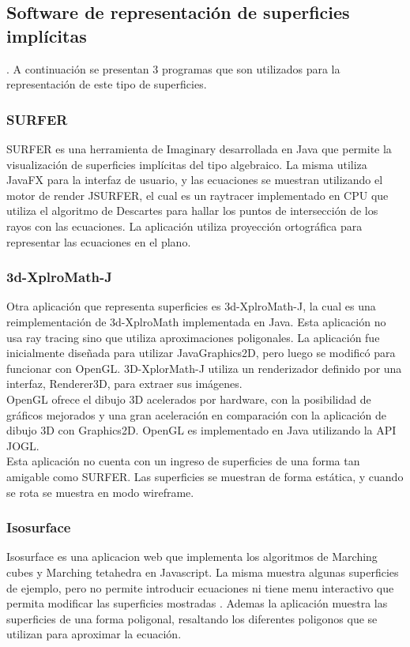 \documentclass[12pt]{article}
\begin{document}
\subsection{Software de representación de superficies implícitas}.
A continuación se presentan 3 programas que son utilizados para la representación de este tipo de superficies.
\subsubsection{SURFER}
SURFER es una herramienta de Imaginary desarrollada en Java que permite la visualización de superficies implícitas del tipo algebraico. La misma utiliza JavaFX para la interfaz de usuario, y las ecuaciones se muestran utilizando el motor de render JSURFER, el cual es un raytracer implementado en CPU que utiliza el algoritmo de Descartes para hallar los puntos de intersección de los rayos con las ecuaciones. La aplicación utiliza proyección ortográfica para representar las ecuaciones en el plano.
\subsubsection{3d-XplroMath-J}
Otra aplicación que representa superficies es 3d-XplroMath-J, la cual es una reimplementación de 3d-XplroMath implementada en Java. Esta aplicación no usa ray tracing sino que utiliza aproximaciones poligonales. La aplicación fue inicialmente diseñada para utilizar JavaGraphics2D, pero luego se modificó para funcionar con OpenGL. 3D-XplorMath-J utiliza un  renderizador definido por una interfaz, Renderer3D, para extraer sus imágenes. 
\\OpenGL ofrece el dibujo 3D acelerados por hardware, con la posibilidad de gráficos mejorados y una gran aceleración en comparación con la aplicación de dibujo 3D con Graphics2D. OpenGL es implementado en Java utilizando la API JOGL.
\\Esta aplicación no cuenta con un ingreso de superficies de una forma tan amigable como SURFER. Las superficies se muestran de forma estática, y cuando se rota se muestra en modo wireframe.
\subsubsection{Isosurface}
Isosurface es una aplicacion web que implementa los algoritmos de Marching cubes y Marching tetahedra en Javascript. La misma muestra algunas superficies de ejemplo, pero no permite introducir ecuaciones ni tiene menu interactivo que permita modificar las superficies mostradas . Ademas la aplicación muestra las superficies de una forma poligonal, resaltando los diferentes poligonos que se utilizan para aproximar la ecuación.  
\end{document}
